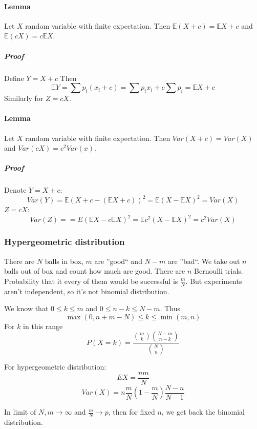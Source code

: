 \paragraph{Lemma}
Let $X$ random variable with finite expectation. Then $\mathbb{E}(X+c) = \mathbb{E}X + c$ and $\mathbb{E}(cX) = c\mathbb{E}X$.
\subparagraph{Proof}
Define $Y= X+c$
Then
$$\mathbb{E}Y  = \sum p_i (x_i + c) = \sum p_i x_i + c\sum p_i = \mathbb{E}X+c $$
Similarly for $Z=cX$.
\paragraph{Lemma}
Let $X$ random variable with finite expectation. Then $Var(X+c) = Var(X)$ and $Var(cX) = c^2 Var(x)$.
\subparagraph{Proof}
Denote $Y = X+c$:
$$Var(Y) = \mathbb{E}(X+c - (\mathbb{E}X+c))^2 = \mathbb{E}(X-\mathbb{E}X)^2 = Var(X)$$
$Z=cX$:
$$Var(Z) = = E(\mathbb{E}X - c\mathbb{E}X)^2 = \mathbb{E}c^2(X-\mathbb{E}X)^2 = c^2 Var(X)$$

\subsubsection{Hypergeometric distribution}
There are $N$ balls in box, $m$ are ''good`` and $N-m$ are ''bad``. We take out $n$ balls out of box and count how much are good. There are $n$ Bernoulli trials. Probability that it every of them would be successful is $\frac{m}{N}$. But experiments aren't independent, so it's not binomial distribution.

We know that $0\leq k \leq m$ and $0\leq n-k \leq N-m$. Thus $$\max (0, n+m-N) \leq k \leq \min(m,n)$$
For $k$ in this range
$$P(X=k) = \frac{\binom{m}{k}\binom{N-m}{n-k}}{\binom{N}{n}}$$

For hypergeometric distribution:
$$EX = \frac{nm}{N}$$
$$Var(X) = n \frac{m}{N}\left(1-\frac{m}{N}\right) \frac{N-n}{N-1}$$

In limit of $N,m \to \infty$ and $\frac{m}{N} \to p$, then for fixed $n$, we get back the binomial distribution.